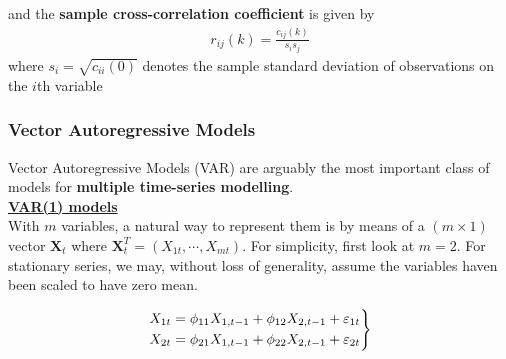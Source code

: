 and the \textbf{sample cross-correlation coefficient} is given by
\begin{align}
    r_{ij}(k)=\frac{c_{ij}(k)}{s_is_j}
\end{align}
\quad where $s_i=\sqrt{c_{ii}(0)}$ denotes the sample standard deviation of observations on the $i$th variable

\subsubsection{Vector Autoregressive Models}

Vector Autoregressive Models (VAR) are arguably the most important class of models for \textbf{multiple time-series modelling}.\\

\bigskip
\noindent
\textbf{\underline{VAR(1) models}}\\

With $m$ variables, a natural way to represent them is by means of a $(m\times 1)$ vector $\mathbf{X}_t$ where $\mathbf{X}_t^T=(X_{1t},\cdots, X_{mt})$. For simplicity, first look at $m=2$. For stationary series, we may, without loss of generality, assume the variables haven been scaled to have zero mean. 

\begin{equation}
\begin{array}{r@{}l}
& \left.
\begin{aligned}
    X_{1t} &= \phi_{11} X_{1,t-1} + \phi_{12} X_{2,t-1} + \varepsilon_{1t} \\
    X_{2t} &= \phi_{21} X_{1,t-1} + \phi_{22} X_{2,t-1} + \varepsilon_{2t} \label{eq9}
\end{aligned}
\right\}
\end{array}
\end{equation}


